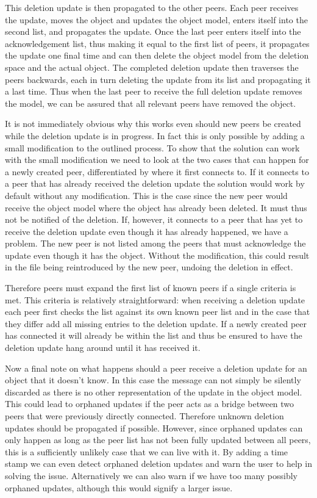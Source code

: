 This deletion update is then propagated to the other peers.
Each peer receives the update, moves the object and updates the object model, enters itself into the second list, and propagates the update.
Once the last peer enters itself into the acknowledgement list, thus making it equal to the first list of peers, it propagates the update one final time and can then delete the object model from the deletion space and the actual object.
The completed deletion update then traverses the peers backwards, each in turn deleting the update from its list and propagating it a last time.
Thus when the last peer to receive the full deletion update removes the model, we can be assured that all relevant peers have removed the object.

It is not immediately obvious why this works even should new peers be created while the deletion update is in progress.
In fact this is only possible by adding a small modification to the outlined process.
To show that the solution can work with the small modification we need to look at the two cases that can happen for a newly created peer, differentiated by where it first connects to.
If it connects to a peer that has already received the deletion update the solution would work by default without any modification.
This is the case since the new peer would receive the object model where the object has already been deleted.
It must thus not be notified of the deletion.
If, however, it connects to a peer that has yet to receive the deletion update even though it has already happened, we have a problem.
The new peer is not listed among the peers that must acknowledge the update even though it has the object.
Without the modification, this could result in the file being reintroduced by the new peer, undoing the deletion in effect.

Therefore peers must expand the first list of known peers if a single criteria is met.
This criteria is relatively straightforward: when receiving a deletion update each peer first checks the list against its own known peer list and in the case that they differ add all missing entries to the deletion update.
If a newly created peer has connected it will already be within the list and thus be ensured to have the deletion update hang around until it has received it.

Now a final note on what happens should a peer receive a deletion update for an object that it doesn't know.
In this case the message can not simply be silently discarded as there is no other representation of the update in the object model.
This could lead to orphaned updates if the peer acts as a bridge between two peers that were previously directly connected.
Therefore unknown deletion updates should be propagated if possible.
However, since orphaned updates can only happen as long as the peer list has not been fully updated between all peers, this is a sufficiently unlikely case that we can live with it.
By adding a time stamp we can even detect orphaned deletion updates and warn the user to help in solving the issue.
Alternatively we can also warn if we have too many possibly orphaned updates, although this would signify a larger issue.

